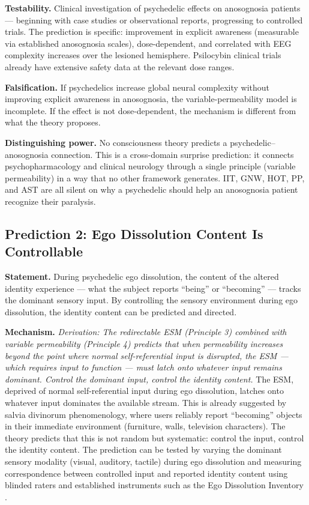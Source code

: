 \documentclass[12pt]{article}
\begin{document}
\textbf{Testability.} Clinical investigation of psychedelic effects on anosognosia patients --- beginning with case studies or observational reports, progressing to controlled trials. The prediction is specific: improvement in explicit awareness (measurable via established anosognosia scales), dose-dependent, and correlated with EEG complexity increases over the lesioned hemisphere. Psilocybin clinical trials already have extensive safety data at the relevant dose ranges.

\textbf{Falsification.} If psychedelics increase global neural complexity without improving explicit awareness in anosognosia, the variable-permeability model is incomplete. If the effect is not dose-dependent, the mechanism is different from what the theory proposes.

\textbf{Distinguishing power.} No consciousness theory predicts a psychedelic--anosognosia connection. This is a cross-domain surprise prediction: it connects psychopharmacology and clinical neurology through a single principle (variable permeability) in a way that no other framework generates. IIT, GNW, HOT, PP, and AST are all silent on why a psychedelic should help an anosognosia patient recognize their paralysis.


\subsection{Prediction 2: Ego Dissolution Content Is Controllable}


\textbf{Statement.} During psychedelic ego dissolution, the content of the altered identity experience --- what the subject reports ``being'' or ``becoming'' --- tracks the dominant sensory input. By controlling the sensory environment during ego dissolution, the identity content can be predicted and directed.

\textbf{Mechanism.} \emph{Derivation: The redirectable ESM (Principle 3) combined with variable permeability (Principle 4) predicts that when permeability increases beyond the point where normal self-referential input is disrupted, the ESM --- which requires input to function --- must latch onto whatever input remains dominant. Control the dominant input, control the identity content.} The ESM, deprived of normal self-referential input during ego dissolution, latches onto whatever input dominates the available stream. This is already suggested by salvia divinorum phenomenology, where users reliably report ``becoming'' objects in their immediate environment (furniture, walls, television characters). The theory predicts that this is not random but systematic: control the input, control the identity content. The prediction can be tested by varying the dominant sensory modality (visual, auditory, tactile) during ego dissolution and measuring correspondence between controlled input and reported identity content using blinded raters and established instruments such as the Ego Dissolution Inventory \citep{Nour2016}.
\end{document}
